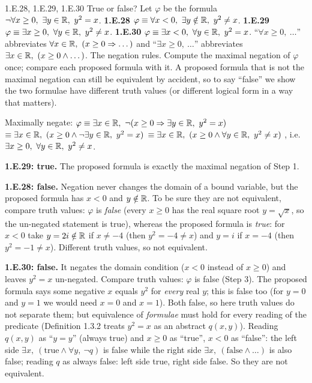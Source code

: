 \begin{bookex}[recommended]{1.E.28, 1.E.29, 1.E.30}
True or false? Let $\varphi$ be the formula $\neg\forall x\ge0,\ \exists y\in\mathbb{R},\ y^2=x$. \textbf{1.E.28} $\varphi\equiv\forall x<0,\ \exists y\notin\R,\ y^2\ne x$. \textbf{1.E.29} $\varphi\equiv\exists x\ge0,\ \forall y\in\R,\ y^2\ne x$. \textbf{1.E.30} $\varphi\equiv\exists x<0,\ \forall y\in\R,\ y^2=x$.
\solution
\given ``$\forall x\ge0,\ \dots$'' abbreviates $\forall x\in\R,\ (x\ge0\Rightarrow\dots)$ and ``$\exists x\ge0,\ \dots$'' abbreviates $\exists x\in\R,\ (x\ge0\wedge\dots)$. The negation rules.
\plan Compute the maximal negation of $\varphi$ once; compare each proposed formula with it. A proposed formula that is not the maximal negation can still be equivalent by accident, so to say ``false'' we show the two formulae have different truth values (or different logical form in a way that matters).
\begin{steps}
\item Maximally negate: $\varphi\equiv\exists x\in\mathbb{R},\ \neg(x\ge0\Rightarrow\exists y\in\mathbb{R},\ y^2=x)$ \why{$\neg\forall\to\exists\neg$} $\equiv\exists x\in\mathbb{R},\ (x\ge0\wedge\neg\exists y\in\mathbb{R},\ y^2=x)$  $\equiv\exists x\in\mathbb{R},\ (x\ge0\wedge\forall y\in\mathbb{R},\ y^2\ne x)$ \why{$\neg\exists\to\forall\neg$}, i.e.\ $\exists x\ge0,\ \forall y\in\mathbb{R},\ y^2\ne x$.
\item \textbf{1.E.29: true.} The proposed formula is exactly the maximal negation of Step 1.
\item \textbf{1.E.28: false.} Negation never changes the domain of a bound variable, but the proposed formula has $x<0$ and $y\notin\mathbb{R}$. To be sure they are not equivalent, compare truth values: $\varphi$ is \emph{false} (every $x\ge0$ has the real square root $y=\sqrt x$, so the un-negated statement is true), whereas the proposed formula is \emph{true}: for $x<0$ take $y=2i\notin\mathbb{R}$ if $x\ne-4$ (then $y^2=-4\ne x$) and $y=i$ if $x=-4$ (then $y^2=-1\ne x$). Different truth values, so not equivalent.
\item \textbf{1.E.30: false.} It negates the domain condition ($x<0$ instead of $x\ge0$) and leaves $y^2=x$ un-negated. Compare truth values: $\varphi$ is false (Step 3). The proposed formula says some negative $x$ equals $y^2$ for \emph{every} real $y$; this is false too (for $y=0$ and $y=1$ we would need $x=0$ and $x=1$). Both false, so here truth values do not separate them; but equivalence of \emph{formulae} must hold for every reading of the predicate (Definition 1.3.2 treats $y^2=x$ as an abstract $q(x,y)$). Reading $q(x,y)$ as ``$y=y$'' (always true) and $x\ge0$ as ``true'', $x<0$ as ``false'': the left side $\exists x,\ (\text{true}\wedge\forall y,\ \neg q)$ is false while the right side $\exists x,\ (\text{false}\wedge\dots)$ is also false; reading $q$ as always false: left side true, right side false. So they are not equivalent.

\end{steps}
\end{bookex}
